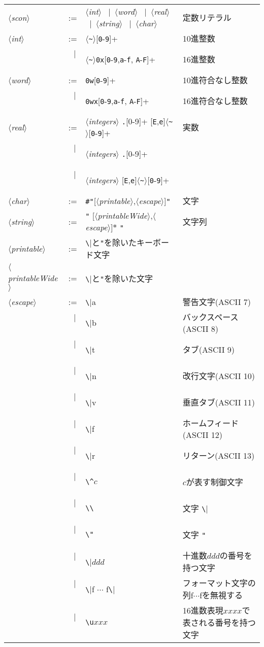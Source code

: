 \documentclass{jbook}
\newcommand{\vbar}{\mbox{\ $|$\ }}
\newcommand{\nonterm}[1]{\mbox{$\langle$}{\it #1}\mbox{$\rangle$}}
\newcommand{\term}[1]{\mbox{{\tt #1}}}
\begin{document}
\begin{description}
\begin{center}
\begin{tabular}{lcll}
\nonterm{scon} &:=& 
\nonterm{int} 
\vbar \nonterm{word} 
\vbar \nonterm{real} 
\vbar \nonterm{string} 
\vbar \nonterm{char}
&定数リテラル\\
\nonterm{int} &:=& $\langle$\verb|~|$\rangle$[\term{0}-\term{9}]+ & 10進整数\\
&\vbar& $\langle$\verb|~|$\rangle$\verb|0x|[\term{0}-\term{9},\term{a}-\term{f},%
\term{A}-\term{F}]+& 16進整数\\[0.5ex]
\nonterm{word} &:=& \verb|0w|[\term{0}-\term{9}]+& 10進符合なし整数\\
&\vbar&\verb|0wx|[\term{0}-\term{9},\term{a}-\term{f},%
\term{A}-\term{F}]+& 16進符合なし整数\\[0.5ex]
\nonterm{real}&:=& 
\nonterm{integers} \term{.}[0-9]+
[\term{E},\term{e}]$\langle$\verb|~|$\rangle$[\term{0}-\term{9}]+
&実数\\
&\vbar&\nonterm{integers} \term{.}[0-9]+ 
&\\
&\vbar&\nonterm{integers} 
[\term{E},\term{e}]$\langle$\verb|~|$\rangle$[\term{0}-\term{9}]+
&\\
\nonterm{char} &:=& \verb|#"|[\nonterm{printable},\nonterm{escape}]\verb|"|&文字\\
\nonterm{string} &:=& \verb|"| [\nonterm{printableWide},\nonterm{escape}]$*$ \verb|"|&文字列\\
\nonterm{printable} &:=& \verb|\|と\verb|"|を除いたキーボード文字\\
\nonterm{printableWide} &:=& \verb|\|と\verb|"|を除いた文字\\
\nonterm{escape} &:=& \verb|\|a & 警告文字(ASCII 7)\\
&\vbar&\verb|\|b & バックスペース(ASCII 8)\\
&\vbar&\verb|\|t & タブ(ASCII 9)\\
&\vbar&\verb|\|n & 改行文字(ASCII 10)\\
&\vbar&\verb|\|v & 垂直タブ(ASCII 11)\\
&\vbar&\verb|\|f & ホームフィード(ASCII 12)\\
&\vbar&\verb|\|r & リターン(ASCII 13)\\
&\vbar&\verb|\^|$c$ & $c$が表す制御文字\\
&\vbar&\verb|\\| & 文字 \verb|\|\\
&\vbar&\verb|\"| & 文字 \verb|"|\\   %
&\vbar&\verb|\|$ddd$ & 十進数$ddd$の番号を持つ文字\\
&\vbar&\verb|\|f $\cdots$ f\verb|\|& フォーマット文字の列f$\cdots$fを無視する\\
&\vbar&\verb|\u|$xxx$& 16進数表現$xxxx$で表される番号を持つ文字\\
\end{tabular}
\end{center}
\end{description}
\end{document}
